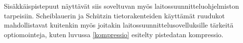 Sisäkkäispistepuut näyttävät siis soveltuvan myös laitossuunnitteluohjelmiston tarpeisiin. Scheiblauerin ja Schützin tietorakenteiden käyttämät ruudukot mahdollistavat kuitenkin myös joitakin laitossuunnittelusovelluksille tärkeitä optiomointeja, kuten luvussa \ref{kompressio} esitelty pistedatan kompressio.
